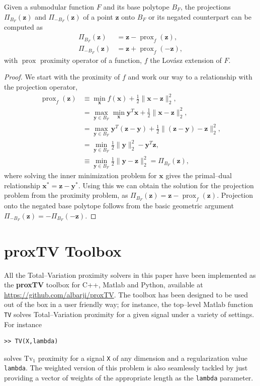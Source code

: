 \documentclass[twoside,11pt]{article}
\newcommand{\vx}{\bm{x}}       \newcommand{\vxh}{\hat{\bm{x}}}        \newcommand{\xh}{\hat{x}}    \newcommand{\vxt}{\tilde{\bm{x}}}       \newcommand{\xt}{\tilde{x}}
\newcommand{\vy}{\bm{y}}       \newcommand{\vyh}{\hat{\bm{y}}}        \newcommand{\yh}{\hat{y}}    \newcommand{\vyt}{\tilde{\bm{y}}}       \newcommand{\yt}{\tilde{y}}
\newcommand{\vz}{\bm{z}}       \newcommand{\vzh}{\hat{\bm{z}}}        \newcommand{\zh}{\hat{z}}    \newcommand{\vzt}{\tilde{\bm{z}}}       \newcommand{\zt}{\tilde{z}}
\newcommand{\mynorm}[2]{\| {#1} \|_{#2}}
\newcommand{\enorm}[1]{\mynorm{#1}{2}}
\DeclareMathOperator{\prox}{prox}
\newcommand{\half}{\tfrac{1}{2}}
\newcommand{\tvell}{\text{Tv}}
\numberwithin{equation}{section}
\numberwithin{theorem}{section}
\begin{document}
\begin{proposition}
 \label{pro:projpolytopes}
 Given a submodular function $F$ and its base polytope $B_F$, the projections $\Pi_{B_F}(\vz)$ and $\Pi_{-B_F}(\vz)$ of a point $\vz$ onto $B_F$ or its negated counterpart can be computed as
 \begin{align*}
  \Pi_{B_F}(\vz) &= \vz - \prox_f(\vz) , \\
  \Pi_{-B_F}(\vz) &= \vz + \prox_f(-\vz) ,
 \end{align*}
 with $\prox$ proximity operator of a function, $f$ the Lovász extension of $F$.
\end{proposition}
\begin{proof}
 We start with the proximity of $f$ and work our way to a relationship with the projection operator,
 \begin{align*}
  \prox_f(\vz) &\equiv \min_{\vx} f(\vx) + \half \enorm{\vx - \vz}^2, \\
   &= \max_{\vy \in B_F} \min_{\vx} \vy^T \vx + \half \enorm{\vx - \vz}^2, \\
   &= \max_{\vy \in B_F} \vy^T (\vz - \vy) + \half \enorm{(\vz - \vy) - \vz}^2, \\
   &= \min_{\vy \in B_F} \half \enorm{\vy}^2 - \vy^T \vz, \\
   &\equiv \min_{\vy \in B_F} \half \enorm{\vy - \vz}^2 = \Pi_{B_F}(\vz),
 \end{align*}
 where solving the inner minimization problem for $\vx$ gives the primal--dual relationship $\vx^* = \vz - \vy^*$. Using this we can obtain the solution for the projection problem from the proximity problem, as $\Pi_{B_F}(\vz) = \vz - \prox_f(\vz)$. Projection onto the negated base polytope follows from the basic geometric argument $\Pi_{-B_F}(\vz) = -\Pi_{B_F}(-\vz)$.
\end{proof}


\section{proxTV Toolbox}

All the Total--Variation proximity solvers in this paper have been implemented as the {\bf proxTV} toolbox for C++, Matlab and Python, available at \url{https://github.com/albarji/proxTV}. The toolbox has been designed to be used out of the box in a user friendly way; for instance, the top--level Matlab function \texttt{TV} solves Total--Variation proximity for a given signal under a variety of settings. For instance
\begin{lstlisting}
>> TV(X,lambda)
\end{lstlisting}
solves $\tvell_1$ proximity for a signal \texttt{X} of any dimension and a regularization value \texttt{lambda}. The weighted version of this problem  is also seamlessly tackled by just providing a vector of weights of the appropriate length as the \texttt{lambda} parameter.
\end{document}
